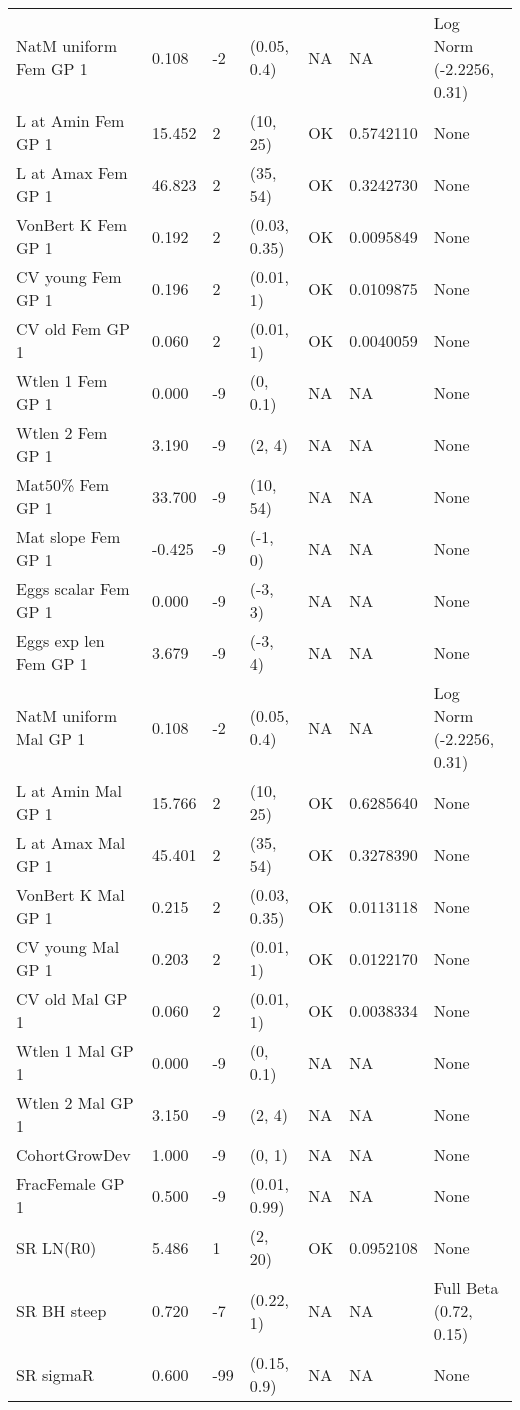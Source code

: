 \documentclass[11pt,
  english,
  letterpaper,
]{article}
\begin{document}
\begin{landscape}
\begin{longtable}[t]{>{\raggedright\arraybackslash}p{7cm}lllll>{\raggedright\arraybackslash}p{4cm}}
\endfoot
\bottomrule
\endlastfoot
NatM uniform Fem GP 1 & 0.108 & -2 & (0.05, 0.4) & NA & NA & Log Norm (-2.2256, 0.31)\\
L at Amin Fem GP 1 & 15.452 & 2 & (10, 25) & OK & 0.5742110 & None\\
L at Amax Fem GP 1 & 46.823 & 2 & (35, 54) & OK & 0.3242730 & None\\
VonBert K Fem GP 1 & 0.192 & 2 & (0.03, 0.35) & OK & 0.0095849 & None\\
CV young Fem GP 1 & 0.196 & 2 & (0.01, 1) & OK & 0.0109875 & None\\
CV old Fem GP 1 & 0.060 & 2 & (0.01, 1) & OK & 0.0040059 & None\\
Wtlen 1 Fem GP 1 & 0.000 & -9 & (0, 0.1) & NA & NA & None\\
Wtlen 2 Fem GP 1 & 3.190 & -9 & (2, 4) & NA & NA & None\\
Mat50\% Fem GP 1 & 33.700 & -9 & (10, 54) & NA & NA & None\\
Mat slope Fem GP 1 & -0.425 & -9 & (-1, 0) & NA & NA & None\\
Eggs scalar Fem GP 1 & 0.000 & -9 & (-3, 3) & NA & NA & None\\
Eggs exp len Fem GP 1 & 3.679 & -9 & (-3, 4) & NA & NA & None\\
NatM uniform Mal GP 1 & 0.108 & -2 & (0.05, 0.4) & NA & NA & Log Norm (-2.2256, 0.31)\\
L at Amin Mal GP 1 & 15.766 & 2 & (10, 25) & OK & 0.6285640 & None\\
L at Amax Mal GP 1 & 45.401 & 2 & (35, 54) & OK & 0.3278390 & None\\
VonBert K Mal GP 1 & 0.215 & 2 & (0.03, 0.35) & OK & 0.0113118 & None\\
CV young Mal GP 1 & 0.203 & 2 & (0.01, 1) & OK & 0.0122170 & None\\
CV old Mal GP 1 & 0.060 & 2 & (0.01, 1) & OK & 0.0038334 & None\\
Wtlen 1 Mal GP 1 & 0.000 & -9 & (0, 0.1) & NA & NA & None\\
Wtlen 2 Mal GP 1 & 3.150 & -9 & (2, 4) & NA & NA & None\\
CohortGrowDev & 1.000 & -9 & (0, 1) & NA & NA & None\\
FracFemale GP 1 & 0.500 & -9 & (0.01, 0.99) & NA & NA & None\\
SR LN(R0) & 5.486 & 1 & (2, 20) & OK & 0.0952108 & None\\
SR BH steep & 0.720 & -7 & (0.22, 1) & NA & NA & Full Beta (0.72, 0.15)\\
SR sigmaR & 0.600 & -99 & (0.15, 0.9) & NA & NA & None\\

\end{longtable}
\end{landscape}
\end{document}
